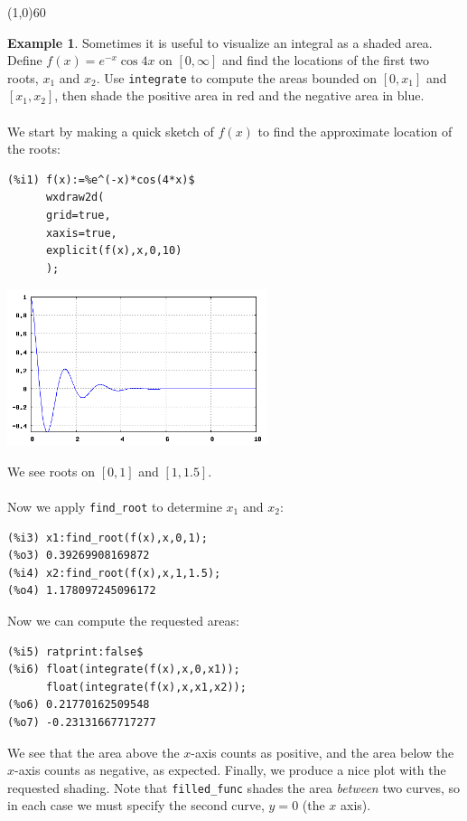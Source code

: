 \documentclass[10.5pt,twoside]{report}
\theoremstyle{definition}
\newtheorem{exmp}{Example}[section]
\begin{document}
\line(1,0){60}
\linethickness{0.5mm}

\begin{exmp} Sometimes it is useful to visualize an integral as a shaded area.  Define $f(x)=e^{-x}\cos{4x}$ on $[0,\infty]$ and find the locations of the first two roots, $x_1$ and $x_2$.  Use \verb|integrate| to compute the areas bounded on $[0,x_1]$ and $[x_1,x_2]$, then shade the positive area in red and the negative area in blue. \\
${}$\\

We start by making a quick sketch of $f(x)$ to find the approximate location of the roots:

\begin{verbatim}
(%i1) f(x):=%e^(-x)*cos(4*x)$
      wxdraw2d(
      grid=true,
      xaxis=true,
      explicit(f(x),x,0,10)
      );
\end{verbatim}

\includegraphics[width=3in]{example_6_3_2_1}

We see roots on $[0,1]$ and $[1,1.5]$.\\  

${}$\\

Now we apply \verb|find_root| to determine $x_1$ and $x_2$:

\begin{verbatim}
(%i3) x1:find_root(f(x),x,0,1);
(%o3) 0.39269908169872
(%i4) x2:find_root(f(x),x,1,1.5);
(%o4) 1.178097245096172
\end{verbatim}

Now we can compute the requested areas:

\begin{verbatim}
(%i5) ratprint:false$
(%i6) float(integrate(f(x),x,0,x1));
      float(integrate(f(x),x,x1,x2));
(%o6) 0.21770162509548
(%o7) -0.23131667717277
\end{verbatim}

We see that the area above the $x$-axis counts as positive, and the area below the $x$-axis counts as negative, as expected.  Finally, we produce a nice plot with the requested shading.  Note that \verb|filled_func| shades the area \textit{between} two curves, so in each case we must specify the second curve, $y=0$ (the $x$ axis).


\end{exmp}
\end{document}
